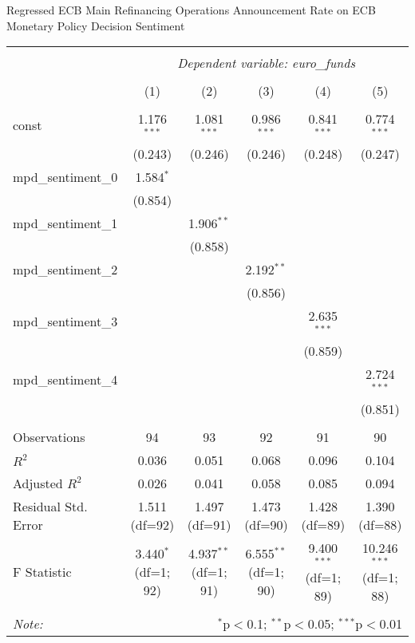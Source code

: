 \documentclass[12pt, letterpaper]{article}
\begin{document}
 Regressed ECB Main Refinancing Operations Announcement Rate on ECB Monetary Policy Decision Sentiment

\begin{table}[H] 
\begin{adjustbox}{width=\textwidth}
\centering
\begin{tabular}{@{\extracolsep{5pt}}lccccc}
\\[-1.8ex]\hline
\hline \\[-1.8ex]
& \multicolumn{5}{c}{\textit{Dependent variable: euro\_funds}} \\
\cline{2-6}
\\[-1.8ex] & (1) & (2) & (3) & (4) & (5) \\
\hline \\[-1.8ex]
const & 1.176$^{***}$ & 1.081$^{***}$ & 0.986$^{***}$ & 0.841$^{***}$ & 0.774$^{***}$ \\
& (0.243) & (0.246) & (0.246) & (0.248) & (0.247) \\
mpd\_sentiment\_0 & 1.584$^{*}$ & & & & \\
& (0.854) & & & & \\
mpd\_sentiment\_1 & & 1.906$^{**}$ & & & \\
& & (0.858) & & & \\
mpd\_sentiment\_2 & & & 2.192$^{**}$ & & \\
& & & (0.856) & & \\
mpd\_sentiment\_3 & & & & 2.635$^{***}$ & \\
& & & & (0.859) & \\
mpd\_sentiment\_4 & & & & & 2.724$^{***}$ \\
& & & & & (0.851) \\
\hline \\[-1.8ex]
Observations & 94 & 93 & 92 & 91 & 90 \\
$R^2$ & 0.036 & 0.051 & 0.068 & 0.096 & 0.104 \\
Adjusted $R^2$ & 0.026 & 0.041 & 0.058 & 0.085 & 0.094 \\
Residual Std. Error & 1.511 (df=92) & 1.497 (df=91) & 1.473 (df=90) & 1.428 (df=89) & 1.390 (df=88) \\
F Statistic & 3.440$^{*}$ (df=1; 92) & 4.937$^{**}$ (df=1; 91) & 6.555$^{**}$ (df=1; 90) & 9.400$^{***}$ (df=1; 89) & 10.246$^{***}$ (df=1; 88) \\
\hline
\hline \\[-1.8ex]
\textit{Note:} & \multicolumn{5}{r}{$^{*}$p$<$0.1; $^{**}$p$<$0.05; $^{***}$p$<$0.01} \\
\end{tabular}
\end{adjustbox}
\end{table}
\end{document}
